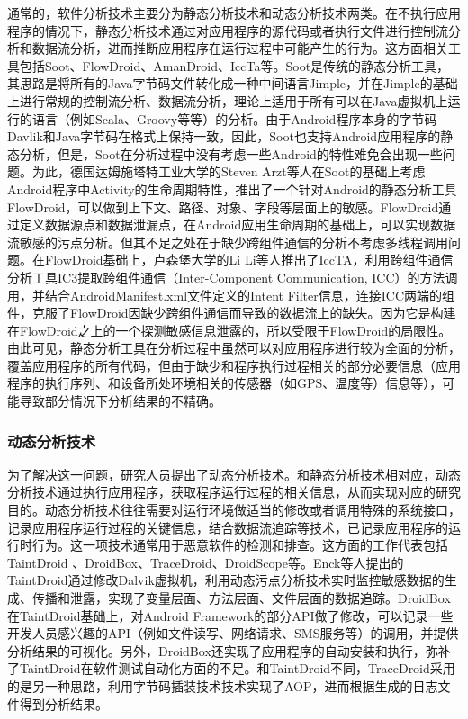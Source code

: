 通常的，软件分析技术主要分为静态分析技术和动态分析技术两类。在不执行应用程序的情况下，静态分析技术通过对应用程序的源代码或者执行文件进行控制流分析和数据流分析，进而推断应用程序在运行过程中可能产生的行为。这方面相关工具包括Soot、FlowDroid、AmanDroid、IccTa等。Soot是传统的静态分析工具，其思路是将所有的Java字节码文件转化成一种中间语言Jimple，并在Jimple的基础上进行常规的控制流分析、数据流分析，理论上适用于所有可以在Java虚拟机上运行的语言（例如Scala、Groovy等等）的分析。由于Android程序本身的字节码Davlik和Java字节码在格式上保持一致，因此，Soot也支持Android应用程序的静态分析，但是，Soot在分析过程中没有考虑一些Android的特性难免会出现一些问题。为此，德国达姆施塔特工业大学的Steven Arzt等人在Soot的基础上考虑Android程序中Activity的生命周期特性，推出了一个针对Android的静态分析工具FlowDroid，可以做到上下文、路径、对象、字段等层面上的敏感。FlowDroid通过定义数据源点和数据泄漏点，在Android应用生命周期的基础上，可以实现数据流敏感的污点分析。但其不足之处在于缺少跨组件通信的分析不考虑多线程调用问题。在FlowDroid基础上，卢森堡大学的Li Li等人推出了IccTA，利用跨组件通信分析工具IC3提取跨组件通信（Inter-Component Communication, ICC）的方法调用，并结合AndroidManifest.xml文件定义的Intent Filter信息，连接ICC两端的组件，克服了FlowDroid因缺少跨组件通信而导致的数据流上的缺失。因为它是构建在FlowDroid之上的一个探测敏感信息泄露的，所以受限于FlowDroid的局限性。由此可见，静态分析工具在分析过程中虽然可以对应用程序进行较为全面的分析，覆盖应用程序的所有代码，但由于缺少和程序执行过程相关的部分必要信息（应用程序的执行序列、和设备所处环境相关的传感器（如GPS、温度等）信息等），可能导致部分情况下分析结果的不精确。


\subsubsection{	动态分析技术}

为了解决这一问题，研究人员提出了动态分析技术。和静态分析技术相对应，动态分析技术通过执行应用程序，获取程序运行过程的相关信息，从而实现对应的研究目的。动态分析技术往往需要对运行环境做适当的修改或者调用特殊的系统接口，记录应用程序运行过程的关键信息，结合数据流追踪等技术，已记录应用程序的运行时行为。这一项技术通常用于恶意软件的检测和排查。这方面的工作代表包括TaintDroid 、DroidBox、TraceDroid、DroidScope等。Enck等人提出的TaintDroid通过修改Dalvik虚拟机，利用动态污点分析技术实时监控敏感数据的生成、传播和泄露，实现了变量层面、方法层面、文件层面的数据追踪。DroidBox在TaintDroid基础上，对Android Framework的部分API做了修改，可以记录一些开发人员感兴趣的API（例如文件读写、网络请求、SMS服务等）的调用，并提供分析结果的可视化。另外，DroidBox还实现了应用程序的自动安装和执行，弥补了TaintDroid在软件测试自动化方面的不足。和TaintDroid不同，TraceDroid采用的是另一种思路，利用字节码插装技术技术实现了AOP，进而根据生成的日志文件得到分析结果。

